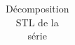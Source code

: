 \begin{table}[!h]
\centering
\caption{Décomposition STL de la série}
\centering
\begin{tabular}[t]{}
\toprule

\bottomrule
\end{tabular}
\end{table}
